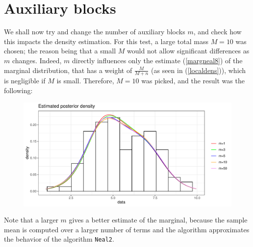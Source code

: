 \section{Auxiliary blocks}
We shall now try and change the number of auxiliary blocks $m$, and check how this impacts the density estimation.
For this test, a large total mass $M=10$ was chosen; the reason being that a small $M$ would not allow significant differences as $m$ changes.
Indeed, $m$ directly influences only the estimate (\ref{margneal8}) of the marginal distribution, that has a weight of $\frac{M}{M+n}$ (as seen in (\ref{localdens})), which is negligible if $M$ is small.
Therefore, $M=10$ was picked, and the result was the following:
\begin{figure}[h]
	\centering
	\includegraphics[scale=0.7]{etc/dens_withmM10.pdf}
\end{figure}

Note that a larger $m$ gives a better estimate of the marginal, because the sample mean is computed over a larger number of terms and the algorithm approximates the behavior of the algorithm \verb|Neal2|.

\clearpage


